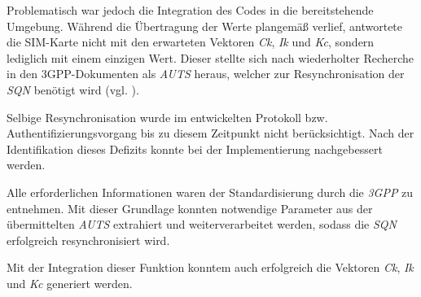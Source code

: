 		Problematisch war jedoch die Integration des Codes in die bereitstehende
		Umgebung. Während die Übertragung der Werte plangemäß verlief, antwortete
		die SIM-Karte nicht mit den erwarteten Vektoren \textit{Ck}, \textit{Ik}
		und \textit{Kc}, sondern lediglich mit einem einzigen Wert. Dieser
		stellte sich nach wiederholter Recherche in den 3GPP-Dokumenten als
		\textit{AUTS} heraus, welcher zur Resynchronisation der \textit{SQN}
		benötigt wird (vgl. ).

		Selbige Resynchronisation wurde im entwickelten
		Protokoll bzw. Authentifizierungsvorgang bis zu diesem Zeitpunkt
		nicht berücksichtigt. Nach der Identifikation dieses Defizits
		konnte bei der Implementierung nachgebessert werden.

		Alle erforderlichen Informationen waren der Standardisierung
		durch die \textit{3GPP} zu entnehmen. Mit dieser Grundlage konnten
		notwendige Parameter aus der übermittelten \textit{AUTS} extrahiert
		und weiterverarbeitet werden, sodass die \textit{SQN} erfolgreich
		resynchronisiert wird. 

		Mit der Integration dieser Funktion konntem auch erfolgreich die
		Vektoren \textit{Ck}, \textit{Ik} und \textit{Kc} generiert werden.

\clearpage